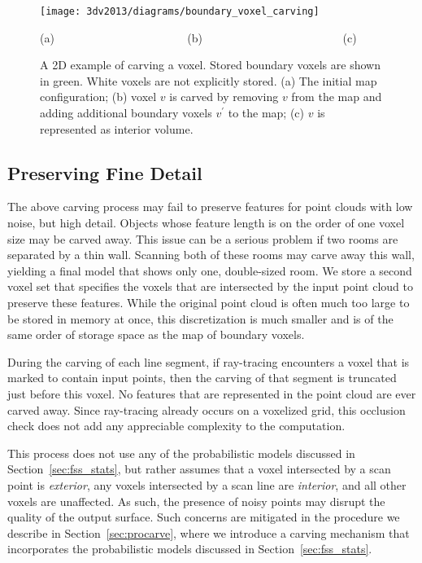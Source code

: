 \documentclass[12pt,onecolumn,oneside]{book}
\begin{document}
\begin{figure}[t]

  \centerline{\texttt{[image: 3dv2013/diagrams/boundary\_voxel\_carving]}}
  \centerline{(a)\,\,\,\,\,\,\,\,\,\,\,\,\,\,\,\,\,\,\,\,\,\,\,\,\,\,\,\,\,\,\,\,\,\,\,\,\,\,\,\,\,\,\,\,\,\,\,\,\,\,\,\,\,\,\,\,\,\,\,\,\,\,\,\,\,\,\,\,\,\,(b)\,\,\,\,\,\,\,\,\,\,\,\,\,\,\,\,\,\,\,\,\,\,\,\,\,\,\,\,\,\,\,\,\,\,\,\,\,\,\,\,\,\,\,\,\,\,\,\,\,\,\,\,\,\,\,\,\,\,\,\,\,\,\,\,\,\,\,\,\,\,\,\,\,\,(c)\,\,\,\,\,}
\caption[A 2D example of carving a voxel.]{A 2D example of carving a voxel.  Stored boundary voxels are shown in green.  White voxels are not explicitly stored. (a) The initial map configuration; (b) voxel $v$ is carved by removing $v$ from the map and adding additional boundary voxels $v^{\prime}$ to the map; (c) $v$ is represented as interior volume.}
\label{fig:dgrid_boundary_carving}
\end{figure}

\subsection{Preserving Fine Detail}
\label{ssec:voxel_carving_preserving_detail}

The above carving process may fail to preserve features for point clouds with low noise, but high detail.  Objects whose feature length is on the order of one voxel size may be carved away.  This issue can be a serious problem if two rooms are separated by a thin wall.  Scanning both of these rooms may carve away this wall, yielding a final model that shows only one, double-sized room.  We store a second voxel set that specifies the voxels that are intersected by the input point cloud to preserve these features.  While the original point cloud is often much too large to be stored in memory at once, this discretization is much smaller and is of the same order of storage space as the map of boundary voxels.

During the carving of each line segment, if ray-tracing encounters a voxel that is marked to contain input points, then the carving of that segment is truncated just before this voxel.  No features that are represented in the point cloud are ever carved away.  Since ray-tracing already occurs on a voxelized grid, this occlusion check does not add any appreciable complexity to the computation.

This process does not use any of the probabilistic models discussed in Section~\ref{sec:fss_stats}, but rather assumes that a voxel intersected by a scan point is {\it exterior}, any voxels intersected by a scan line are {\it interior}, and all other voxels are unaffected.  As such, the presence of noisy points may disrupt the quality of the output surface.  Such concerns are mitigated in the procedure we describe in Section~\ref{sec:procarve}, where we introduce a carving mechanism that incorporates the probabilistic models discussed in Section~\ref{sec:fss_stats}.
\end{document}

